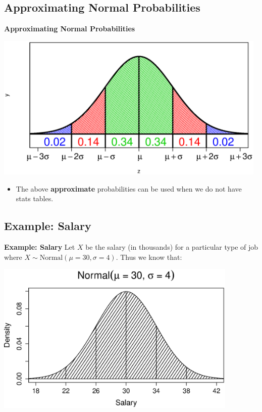 \documentclass[compress]{beamer}        %
\makeatletter
\newcommand{\tcb}{\textcolor{beamer@blendedblue}}
\makeatother
\begin{document}
\subsection{Approximating Normal Probabilities}
\begin{frame}{\bf \tcb{Approximating Normal Probabilities\\[-1.2cm]}}
\begin{center}
\includegraphics[width=0.98\textwidth, trim = 1.5cm 1.5cm 0.7cm 1.5cm, clip]{NormalProbs}
\end{center}
\begin{itemize}
\item The above {\bf approximate} probabilities can be used when we do not have stats tables.
\end{itemize}

\end{frame}




\subsection{Example: Salary}
\begin{frame}{\bf \tcb{Example: Salary}}
Let $X$ be the salary (in thousands) for a particular type of job where $X \sim \text{Normal}(\mu=30,\sigma=4)$. Thus we know that:

\begin{center}
\includegraphics[width=0.87\textwidth, trim = 0.0cm 0.5cm 0.3cm 1.5cm, clip]{NormalSalary}
\end{center}
\end{frame}
\end{document}
